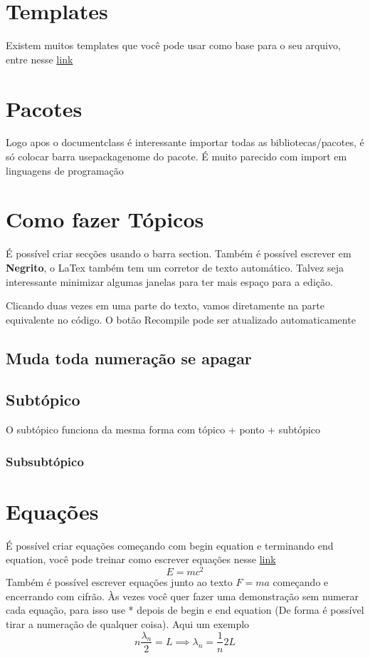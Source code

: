 \documentclass[a4paper]{article}
\begin{document}

\newpage

\tableofcontents
\thispagestyle{empty}
\newpage


\section{Templates}
Existem muitos templates que você pode usar como base para o seu arquivo, entre nesse \href{https://www.overleaf.com/latex/templates}{link}
\section{Pacotes}
Logo apos o documentclass é interessante importar todas as bibliotecas/pacotes, é só colocar barra usepackage{nome do pacote}. É muito parecido com import em linguagens de programação
\section{Como fazer Tópicos}
É possível criar secções usando o barra section{}. Também é possível escrever em \textbf{Negrito}, o LaTex também tem um corretor de texto automático. Talvez seja interessante minimizar algumas janelas para ter mais espaço para a edição. 

Clicando duas vezes em uma parte do texto, vamos diretamente na parte equivalente no código. O botão Recompile pode ser atualizado automaticamente
\subsection{Muda toda numeração se apagar}
\subsection{Subtópico}
O subtópico funciona da mesma forma com tópico + ponto + subtópico
\subsubsection{Subsubtópico}
\section{Equações}
É possível criar equações começando com begin equation e terminando end equation, você pode treinar como escrever equações nesse \href{https://editor.codecogs.com/?lang=pt-pt}{link}
\begin{equation}
    E=mc^2
\end{equation}
Também é possível escrever equações junto ao texto $F=ma$ começando e encerrando com cifrão. Às vezes você quer fazer uma demonstração sem numerar cada equação, para isso use * depois de begin e end equation (De forma é possível tirar a numeração de qualquer coisa). Aqui um exemplo
\begin{equation}
    \label{eqn:comp_onda1}
    n \frac{\lambda_n}{2} = L \implies \lambda_n = \frac{1}{n} 2L
\end{equation}
\end{document}
